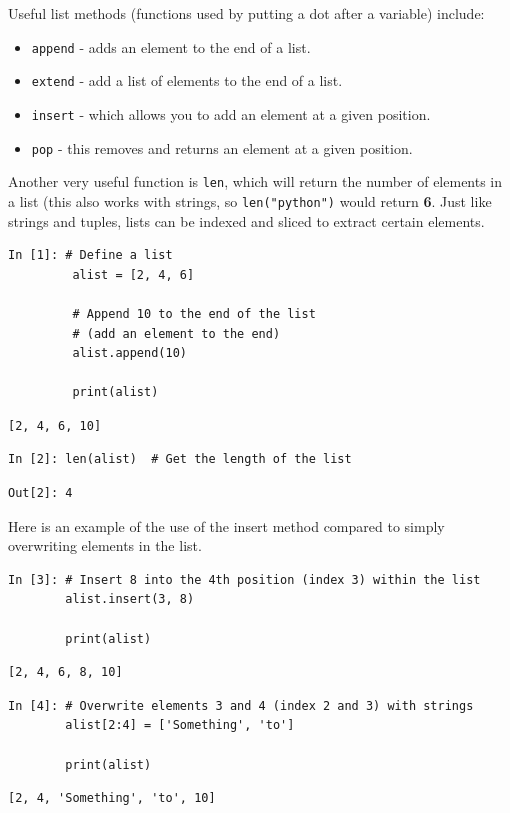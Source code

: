 \noindent Useful list methods (functions used by putting a dot after a variable) include:
\begin{itemize}
    \item \texttt{append} - adds an element to the end of a list.
    \item \texttt{extend} - add a list of elements to the end of a list.
    \item \texttt{insert} - which allows you to add an element at a given position.
    \item \texttt{pop} - this removes and returns an element at a given position.
\end{itemize}

\noindent Another very useful function is \texttt{len}, which will return the number of elements in a list (this also works with strings, so \texttt{len("python")} would return \textbf{6}. Just like strings and tuples, lists can be indexed and sliced to extract certain elements.

\begin{lstlisting}[style=PY] 
In [1]: # Define a list
         alist = [2, 4, 6]
        
         # Append 10 to the end of the list 
         # (add an element to the end) 
         alist.append(10) 
        
         print(alist)
\end{lstlisting}
\begin{lstlisting}[style=PY_out]
        [2, 4, 6, 10]
\end{lstlisting}
\begin{lstlisting}[style=PY]
In [2]: len(alist)  # Get the length of the list
\end{lstlisting}
\begin{lstlisting}[style=PY_out]
Out[2]: 4
\end{lstlisting}

Here is an example of the use of the insert method compared to simply overwriting elements in the list.

\begin{lstlisting}[style=PY]
In [3]: # Insert 8 into the 4th position (index 3) within the list
        alist.insert(3, 8)
         
        print(alist)
\end{lstlisting}
\begin{lstlisting}[style=PY_out]
        [2, 4, 6, 8, 10]
\end{lstlisting}
\begin{lstlisting}[style=PY]
In [4]: # Overwrite elements 3 and 4 (index 2 and 3) with strings
        alist[2:4] = ['Something', 'to']
        
        print(alist)
\end{lstlisting}
\begin{lstlisting}[style=PY_out]
        [2, 4, 'Something', 'to', 10]
\end{lstlisting}

